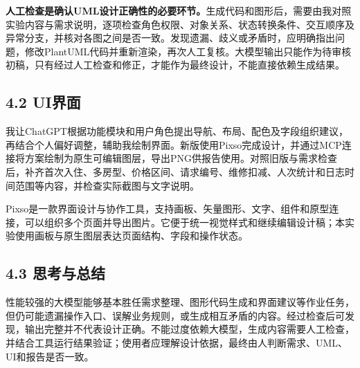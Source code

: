 \documentclass[UTF8]{ctexart}
\begin{document}
\textbf{人工检查是确认UML设计正确性的必要环节。}生成代码和图形后，需要由我对照实验内容与需求说明，逐项检查角色权限、对象关系、状态转换条件、交互顺序及异常分支，并核对各图之间是否一致。发现遗漏、歧义或矛盾时，应明确指出问题，修改PlantUML代码并重新渲染，再次人工复核。大模型输出只能作为待审核初稿，只有经过人工检查和修正，才能作为最终设计，不能直接依赖生成结果。

\subsection*{4.2 UI界面}
我让ChatGPT根据功能模块和用户角色提出导航、布局、配色及字段组织建议，再结合个人偏好调整，辅助我绘制界面。新版使用Pixso完成设计，并通过MCP连接将方案绘制为原生可编辑图层，导出PNG供报告使用。对照旧版与需求检查后，补齐首次入住、多房型、价格区间、请求编号、维修扣减、人次统计和日志时间范围等内容，并检查实际截图与文字说明。

Pixso是一款界面设计与协作工具，支持画板、矢量图形、文字、组件和原型连接，可以组织多个页面并导出图片。它便于统一视觉样式和继续编辑设计稿；本实验使用画板与原生图层表达页面结构、字段和操作状态。

\subsection*{4.3 思考与总结}
性能较强的大模型能够基本胜任需求整理、图形代码生成和界面建议等作业任务，但仍可能遗漏操作入口、误解业务规则，或生成相互矛盾的内容。经过检查后可发现，输出完整并不代表设计正确。不能过度依赖大模型，生成内容需要人工检查，并结合工具运行结果验证；使用者应理解设计依据，最终由人判断需求、UML、UI和报告是否一致。

\label{report:last}
\end{document}
